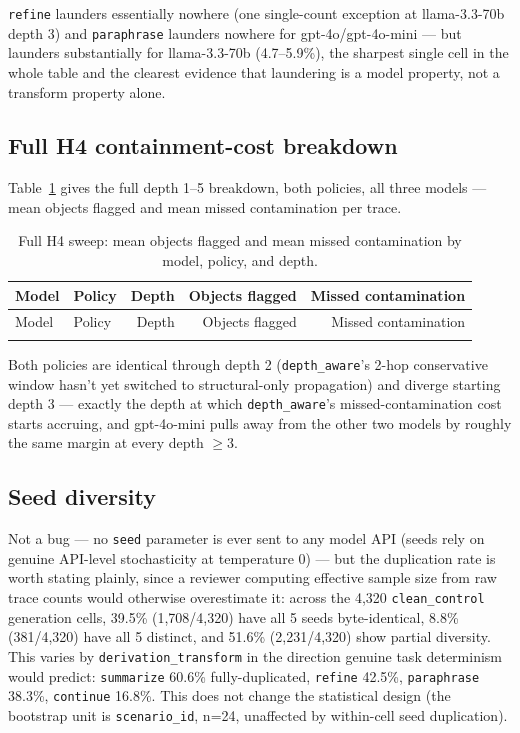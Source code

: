 \texttt{refine} launders essentially nowhere (one single-count exception
at llama-3.3-70b depth 3) and \texttt{paraphrase} launders nowhere for
gpt-4o/gpt-4o-mini --- but launders substantially for llama-3.3-70b
(4.7--5.9\%), the sharpest single cell in the whole table and the
clearest evidence that laundering is a model property, not a transform
property alone.

\subsection{Full H4 containment-cost breakdown}

Table~\ref{tab:appendix-h4} gives the full depth 1--5 breakdown, both
policies, all three models --- mean objects flagged and mean missed
contamination per trace.

\begin{longtable}{@{}llrrr@{}}
\caption{Full H4 sweep: mean objects flagged and mean missed contamination by model, policy, and depth.}
\label{tab:appendix-h4} \\
\toprule
Model & Policy & Depth & Objects flagged & Missed contamination \\
\midrule
\endfirsthead
\toprule
Model & Policy & Depth & Objects flagged & Missed contamination \\
\midrule
\endhead
\bottomrule
\endfoot

\end{longtable}

Both policies are identical through depth 2 (\texttt{depth\_aware}'s
2-hop conservative window hasn't yet switched to structural-only
propagation) and diverge starting depth 3 --- exactly the depth at which
\texttt{depth\_aware}'s missed-contamination cost starts accruing, and
gpt-4o-mini pulls away from the other two models by roughly the same
margin at every depth $\geq 3$.

\subsection{Seed diversity}

Not a bug --- no \texttt{seed} parameter is ever sent to any model API
(seeds rely on genuine API-level stochasticity at temperature 0) --- but
the duplication rate is worth stating plainly, since a reviewer computing
effective sample size from raw trace counts would otherwise overestimate
it: across the 4,320 \texttt{clean\_control} generation cells, 39.5\%
(1,708/4,320) have all 5 seeds byte-identical, 8.8\% (381/4,320) have all
5 distinct, and 51.6\% (2,231/4,320) show partial diversity. This varies
by \texttt{derivation\_transform} in the direction genuine task
determinism would predict: \texttt{summarize} 60.6\% fully-duplicated,
\texttt{refine} 42.5\%, \texttt{paraphrase} 38.3\%, \texttt{continue}
16.8\%. This does not change the statistical design (the bootstrap unit
is \texttt{scenario\_id}, n=24, unaffected by within-cell seed
duplication).


